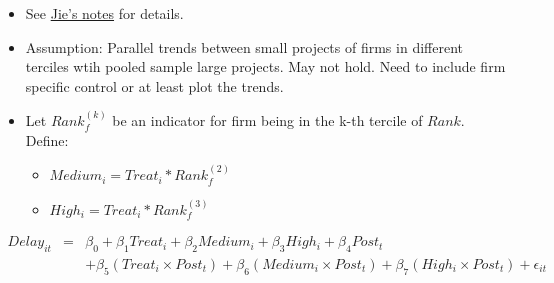 \documentclass[
]{article}
\providecommand{\tightlist}{%
  \setlength{\itemsep}{0pt}\setlength{\parskip}{0pt}}
\begin{document}
\begin{itemize}
\tightlist
\item
  See
  \href{https://github.com/QuickPay-Operational-Performance/Data-and-code/blob/master/notes/Portfolio\%20model\%2B0308.pdf}{Jie's
  notes} for details.
\item
  Assumption: Parallel trends between small projects of firms in
  different terciles wtih pooled sample large projects. May not hold.
  Need to include firm specific control or at least plot the trends.
\item
  Let \(Rank_f^{(k)}\) be an indicator for firm being in the k-th
  tercile of \(Rank\). Define:

  \begin{itemize}
  \tightlist
  \item
    \(Medium_i = Treat_i * Rank_f^{(2)}\)
  \item
    \(High_i = Treat_i * Rank_f^{(3)}\)
  \end{itemize}
\end{itemize}

\[\begin{aligned} Delay_{it}&=&\beta_0+\beta_1 Treat_i + \beta_2 Medium_i+\beta_3 High_i +\beta_4 Post_t\\ && +\beta_5( Treat_i\times Post_t) + \beta_6(Medium_i\times Post_t) + \beta_7(High_i\times Post_t) + \epsilon_{it} \end{aligned}\]
\end{document}
